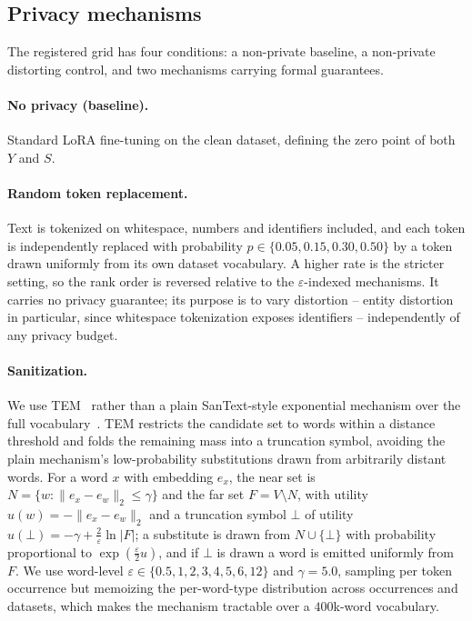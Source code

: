 \subsection{\label{apx:mech}Privacy mechanisms}
The registered grid has four conditions:
a non-private baseline,
a non-private distorting control,
and two mechanisms carrying formal guarantees.

\paragraph{No privacy (baseline).}
Standard LoRA fine-tuning on the clean dataset,
defining the zero point of both $Y$ and $S$.

\paragraph{Random token replacement.}
Text is tokenized on whitespace,
numbers and identifiers included,
and each token is independently replaced with probability $p \in \{0.05, 0.15, 0.30, 0.50\}$ by a token drawn uniformly from its own dataset vocabulary.
A higher rate is the stricter setting,
so the rank order is reversed relative to the $\varepsilon$-indexed mechanisms.
It carries no privacy guarantee;
its purpose is to vary distortion -- entity distortion in particular,
since whitespace tokenization exposes identifiers -- independently of any privacy budget.

\paragraph{Sanitization.}
We use TEM~\citep{carvalho2021tem} rather than a plain SanText-style exponential mechanism over the full vocabulary~\citep{yue2021differential}.
TEM restricts the candidate set to words within a distance threshold and folds the remaining mass into a truncation symbol,
avoiding the plain mechanism's low-probability substitutions drawn from arbitrarily distant words.
For a word $x$ with embedding $e_x$,
the near set is $N = \{w : \lVert e_x - e_w \rVert_2 \le \gamma\}$ and the far set $F = V \setminus N$,
with utility $u(w) = -\lVert e_x - e_w \rVert_2$ and a truncation symbol $\bot$ of utility $u(\bot) = -\gamma + \tfrac{2}{\varepsilon} \ln|F|$;
a substitute is drawn from $N \cup \{\bot\}$ with probability proportional to $\exp(\tfrac{\varepsilon}{2} u)$,
and if $\bot$ is drawn a word is emitted uniformly from $F$. We use word-level $\varepsilon \in \{0.5, 1, 2, 3, 4, 5, 6, 12\}$ and $\gamma = 5.0$,
sampling per token occurrence but memoizing the per-word-type distribution across occurrences and datasets,
which makes the mechanism tractable over a $400$k-word vocabulary.

